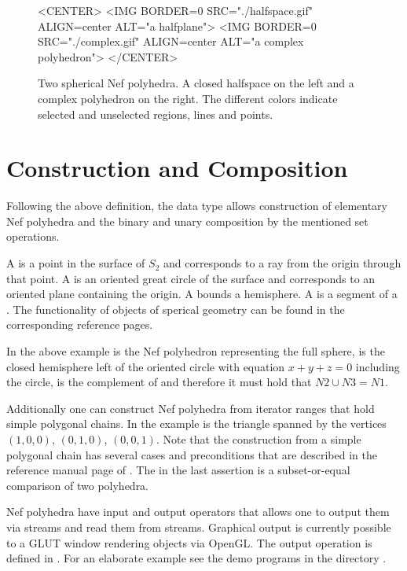 \begin{figure}[htbp]
\begin{ccTexOnly}
\begin{center}
\end{center}
\end{ccTexOnly}
\caption{Two spherical Nef polyhedra. A closed halfspace on the left 
  and a complex polyhedron on the right. The different colors indicate
  selected and unselected regions, lines and points.}\label{nefexamples}
\begin{ccHtmlOnly}
<CENTER>
<IMG BORDER=0 SRC="./halfspace.gif" ALIGN=center
ALT="a halfplane">
<IMG BORDER=0 SRC="./complex.gif" ALIGN=center
ALT="a complex polyhedron">
</CENTER>
\end{ccHtmlOnly}
\end{figure}      

\section{Construction and Composition}

Following the above definition, the data type
 allows construction of elementary Nef
polyhedra and the binary and unary composition by the mentioned set
operations.

A  is a point in the surface of $S_2$ and
corresponds to a ray from the origin through that point. A
 is an oriented great circle of the surface and
corresponds to an oriented plane containing the origin. A
 bounds a hemisphere. A  is 
a segment of a . The functionality of objects
of sperical geometry can be found in the corresponding reference
pages.


In the above example  is the Nef polyhedron representing
the full sphere,  is the closed hemisphere left of the
oriented circle with equation $x + y + z = 0$ including the circle,
 is the complement of  and therefore it must hold that
$N2 \cup N3 = N1$.

Additionally one can construct Nef polyhedra from iterator ranges that
hold simple polygonal chains. In the example  is the triangle
spanned by the vertices $(1,0,0)$, $(0,1,0)$, $(0,0,1)$.  Note that
the construction from a simple polygonal chain has several cases and
preconditions that are described in the reference manual page of
. The  in the last assertion
is a subset-or-equal comparison of two polyhedra.

Nef polyhedra have input and output operators that allows one to
output them via streams and read them from streams. Graphical output
is currently possible to a GLUT window rendering objects via OpenGL.
The output operation is defined in
. For an elaborate
example see the demo programs in the directory .

